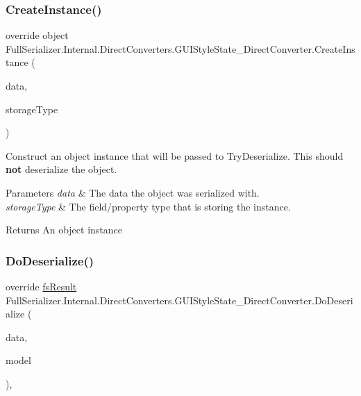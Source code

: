 \subsubsection{\texorpdfstring{Create\+Instance()}{CreateInstance()}}
{\footnotesize\ttfamily override object Full\+Serializer.\+Internal.\+Direct\+Converters.\+G\+U\+I\+Style\+State\+\_\+\+Direct\+Converter.\+Create\+Instance (\begin{DoxyParamCaption}\item[{\hyperlink{class_full_serializer_1_1fs_data}{fs\+Data}}]{data,  }\item[{Type}]{storage\+Type }\end{DoxyParamCaption})\hspace{0.3cm}{\ttfamily [inline]}}



Construct an object instance that will be passed to Try\+Deserialize. This should {\bfseries not} deserialize the object. 


\begin{DoxyParams}{Parameters}
{\em data} & The data the object was serialized with.\\
\hline
{\em storage\+Type} & The field/property type that is storing the instance.\\
\hline
\end{DoxyParams}
\begin{DoxyReturn}{Returns}
An object instance
\end{DoxyReturn}
\mbox{\label{class_full_serializer_1_1_internal_1_1_direct_converters_1_1_g_u_i_style_state___direct_converter_a566d302ecb008a55fab674178d8a52bb}} 
\subsubsection{\texorpdfstring{Do\+Deserialize()}{DoDeserialize()}}
{\footnotesize\ttfamily override \hyperlink{struct_full_serializer_1_1fs_result}{fs\+Result} Full\+Serializer.\+Internal.\+Direct\+Converters.\+G\+U\+I\+Style\+State\+\_\+\+Direct\+Converter.\+Do\+Deserialize (\begin{DoxyParamCaption}\item[{Dictionary$<$ string, \hyperlink{class_full_serializer_1_1fs_data}{fs\+Data} $>$}]{data,  }\item[{ref G\+U\+I\+Style\+State}]{model }\end{DoxyParamCaption})\hspace{0.3cm}{\ttfamily [inline]}, {\ttfamily [protected]}}



